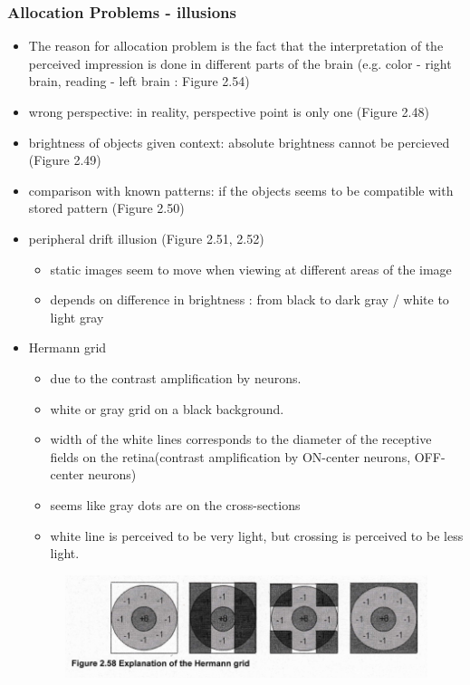 \documentclass{standalone}
\begin{document}
\subsubsection*{Allocation Problems - illusions}
\begin{itemize}
	\item The reason for allocation problem is the fact that the interpretation of the perceived impression is done in different parts of the brain (e.g. color - right brain, reading - left brain : Figure 2.54)
	\item wrong perspective: in reality, perspective point is only one (Figure 2.48)
	\item brightness of objects given context: absolute brightness cannot be percieved (Figure 2.49)
	\item comparison with known patterns: if the objects seems to be compatible with stored pattern (Figure 2.50)
	\item peripheral drift illusion (Figure 2.51, 2.52)
		\begin{itemize}
			\item static images seem to move when viewing at different areas of the image
			\item depends on difference in brightness : from black to dark gray / white to light gray
		\end{itemize}
	\item Hermann grid
		\begin{itemize}
			\item due to the contrast amplification by neurons.
			\item white or gray grid on a black background. 
			\item width of the white lines corresponds to the diameter of the receptive fields on the retina(contrast amplification by ON-center neurons, OFF-center neurons)
			\item seems like gray dots are on the cross-sections
			\item white line is perceived to be very light, but crossing is perceived to be less light.
		\end{itemize} 
		\begin{figure}[H]
			\centering
			\includegraphics[width = 0.7\linewidth]{Figures/2_58.png}

\end{figure}
\end{itemize}
\end{document}

